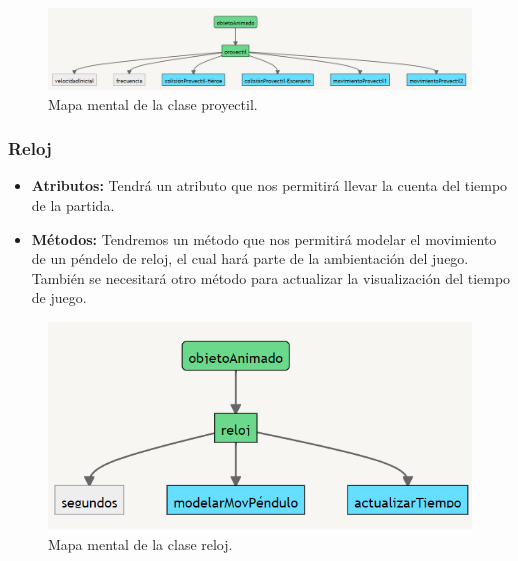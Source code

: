 \documentclass{article}
\begin{document}
\begin{figure}[h]
\includegraphics[scale=0.5]{Images/proyectil.png}
\centering
\caption{Mapa mental de la clase proyectil.}
\label{fig:mmproy}
\end{figure}
    
    
    \subsubsection{Reloj}
    \begin{itemize}
        \item \textbf{Atributos:} Tendrá un atributo que nos permitirá llevar la cuenta del tiempo de la partida.
        \item \textbf{Métodos:} Tendremos un método que nos permitirá modelar el movimiento de un péndelo de reloj, el cual hará parte de la ambientación del juego. También se necesitará otro método para actualizar la visualización del tiempo de juego.
    \end{itemize}
    
    
\begin{figure}[h]
\includegraphics[scale=0.8]{Images/reloj.png}
\centering
\caption{Mapa mental de la clase reloj.}
\label{fig:mmreloj}
\end{figure}
\end{document}
